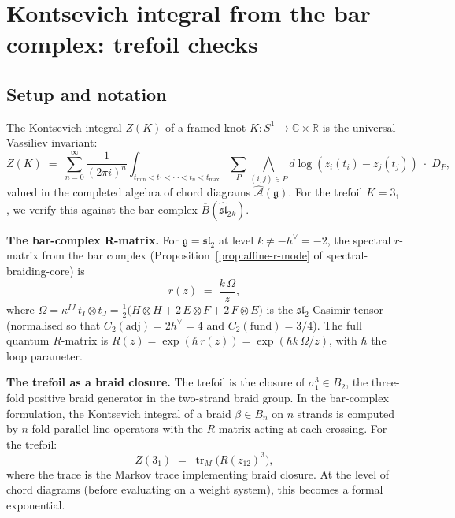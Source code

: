 \documentclass[11pt]{article}
\newcommand{\cA}{\mathcal{A}}
\newcommand{\fg}{\mathfrak{g}}
\newcommand{\fsl}{\mathfrak{sl}}
\newcommand{\barB}{\overline{B}}
\newcommand{\C}{\mathbb{C}}
\newcommand{\R}{\mathbb{R}}
\begin{document}
\section{Kontsevich integral from the bar complex: trefoil checks}
\label{sec:trefoil-verification}

\subsection{Setup and notation}

The Kontsevich integral $Z(K)$ of a framed knot $K : S^1 \to
\C \times \R$ is the universal Vassiliev invariant:
\begin{equation}\label{eq:kontsevich-trefoil}
  Z(K)
  \;=\;
  \sum_{n=0}^{\infty}
  \frac{1}{(2\pi i)^n}
  \int_{t_{\min} < t_1 < \cdots < t_n < t_{\max}}
  \sum_P
  \bigwedge_{(i,j) \in P}
  d\log(z_i(t_i) - z_j(t_j))
  \;\cdot\; D_P,
\end{equation}
valued in the completed algebra of chord diagrams
$\widehat{\cA}(\fg)$.  For the trefoil $K = 3_1$, we verify
this against the bar complex $\barB(\widehat{\fsl}_2{}_k)$.

\medskip
\noindent\textbf{The bar-complex R-matrix.}
For $\fg = \mathfrak{sl}_2$ at level $k \neq -h^\vee = -2$,
the spectral $r$-matrix from the bar complex
(Proposition~\ref{prop:affine-r-mode} of
spectral-braiding-core) is
\begin{equation}\label{eq:sl2-r-matrix}
  r(z) \;=\; \frac{k\,\Omega}{z},
\end{equation}
where
$\Omega = \kappa^{IJ}\, t_I \otimes t_J
= \frac{1}{2}\bigl(H \otimes H + 2\,E \otimes F
+ 2\,F \otimes E\bigr)$
is the $\mathfrak{sl}_2$ Casimir tensor
(normalised so that $C_2(\mathrm{adj}) = 2h^\vee = 4$
and $C_2(\mathrm{fund}) = 3/4$).
The full quantum $R$-matrix is
$R(z) = \exp(\hbar\, r(z)) = \exp(\hbar k\,\Omega/z)$,
with $\hbar$ the loop parameter.

\medskip
\noindent\textbf{The trefoil as a braid closure.}
The trefoil is the closure of $\sigma_1^3 \in B_2$, the
three-fold positive braid generator in the two-strand braid
group.  In the bar-complex formulation, the Kontsevich integral
of a braid $\beta \in B_n$ on $n$ strands is computed by
$n$-fold parallel line operators with the $R$-matrix acting at
each crossing.  For the trefoil:
\begin{equation}\label{eq:trefoil-braid}
  Z(3_1)
  \;=\;
  \operatorname{tr}_{M}\!\bigl(R(z_{12})^3\bigr),
\end{equation}
where the trace is the Markov trace implementing braid
closure.  At the level of chord diagrams (before evaluating on
a weight system), this becomes a formal exponential.
\end{document}
